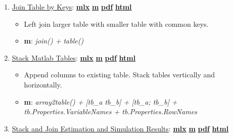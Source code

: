 \documentclass[
]{book}
\providecommand{\tightlist}{%
  \setlength{\itemsep}{0pt}\setlength{\parskip}{0pt}}
\begin{document}
\begin{enumerate}
\def\labelenumi{\arabic{enumi}.}
\tightlist
\item
  \href{https://fanwangecon.github.io/M4Econ/table/join/htmlpdfm/fs_tab_join.html}{Join Table by Keys}: \href{https://github.com/FanWangEcon/M4Econ/blob/master/table/join/fs_tab_join.mlx}{\textbf{mlx}} \textbar{} \href{https://github.com/FanWangEcon/M4Econ/blob/master/table/join/htmlpdfm/fs_tab_join.m}{\textbf{m}} \textbar{} \href{https://github.com/FanWangEcon/M4Econ/blob/master/table/join/htmlpdfm/fs_tab_join.pdf}{\textbf{pdf}} \textbar{} \href{https://fanwangecon.github.io/M4Econ/table/join/htmlpdfm/fs_tab_join.html}{\textbf{html}}

  \begin{itemize}
  \tightlist
  \item
    Left join larger table with smaller table with common keys.
  \item
    \textbf{m}: \emph{join() + table()}
  \end{itemize}
\item
  \href{https://fanwangecon.github.io/M4Econ/table/join/htmlpdfm/fs_tab_stack.html}{Stack Matlab Tables}: \href{https://github.com/FanWangEcon/M4Econ/blob/master/table/join/fs_tab_stack.mlx}{\textbf{mlx}} \textbar{} \href{https://github.com/FanWangEcon/M4Econ/blob/master/table/join/htmlpdfm/fs_tab_stack.m}{\textbf{m}} \textbar{} \href{https://github.com/FanWangEcon/M4Econ/blob/master/table/join/htmlpdfm/fs_tab_stack.pdf}{\textbf{pdf}} \textbar{} \href{https://fanwangecon.github.io/M4Econ/table/join/htmlpdfm/fs_tab_stack.html}{\textbf{html}}

  \begin{itemize}
  \tightlist
  \item
    Append columns to existing table. Stack tables vertically and horizontally.
  \item
    \textbf{m}: \emph{array2table() + {[}tb\_a tb\_b{]} + {[}tb\_a; tb\_b{]} + tb.Properties.VariableNames + tb.Properties.RowNames}
  \end{itemize}
\item
  \href{https://fanwangecon.github.io/M4Econ/table/join/htmlpdfm/fs_tab_stack_simuesti.html}{Stack and Join Estimation and Simulation Results}: \href{https://github.com/FanWangEcon/M4Econ/blob/master/table/join/fs_tab_stack_simuesti.mlx}{\textbf{mlx}} \textbar{} \href{https://github.com/FanWangEcon/M4Econ/blob/master/table/join/htmlpdfm/fs_tab_stack_simuesti.m}{\textbf{m}} \textbar{} \href{https://github.com/FanWangEcon/M4Econ/blob/master/table/join/htmlpdfm/fs_tab_stack_simuesti.pdf}{\textbf{pdf}} \textbar{} \href{https://fanwangecon.github.io/M4Econ/table/join/htmlpdfm/fs_tab_stack_simuesti.html}{\textbf{html}}


\end{enumerate}
\end{document}
